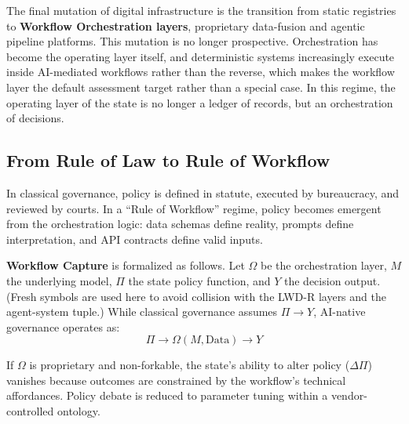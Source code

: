 \documentclass{article}
\theoremstyle{definition}
\begin{document}
The final mutation of digital infrastructure is the transition from static registries to \textbf{Workflow Orchestration layers}, proprietary data-fusion and agentic pipeline platforms. This mutation is no longer prospective. Orchestration has become the operating layer itself, and deterministic systems increasingly execute inside AI-mediated workflows rather than the reverse, which makes the workflow layer the default assessment target rather than a special case. In this regime, the operating layer of the state is no longer a ledger of records, but an orchestration of decisions.

\subsection{From Rule of Law to Rule of Workflow}

In classical governance, policy is defined in statute, executed by bureaucracy, and reviewed by courts. In a ``Rule of Workflow'' regime, policy becomes emergent from the orchestration logic: data schemas define reality, prompts define interpretation, and API contracts define valid inputs.

\textbf{Workflow Capture} is formalized as follows. Let $\Omega$ be the orchestration layer, $M$ the underlying model, $\Pi$ the state policy function, and $Y$ the decision output. (Fresh symbols are used here to avoid collision with the LWD-R layers and the agent-system tuple.) While classical governance assumes $\Pi \rightarrow Y$, AI-native governance operates as:
\begin{equation}
\Pi \rightarrow \Omega(M, \text{Data}) \rightarrow Y
\end{equation}

If $\Omega$ is proprietary and non-forkable, the state's ability to alter policy ($\Delta \Pi$) vanishes because outcomes are constrained by the workflow's technical affordances. Policy debate is reduced to parameter tuning within a vendor-controlled ontology.
\end{document}
